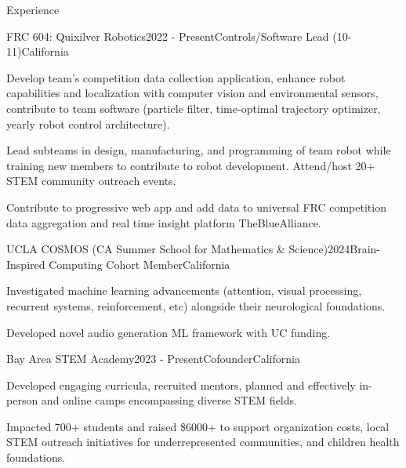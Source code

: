 \documentclass[
  10pt, %
]{resume} %
\begin{document}
\sloppy


\begin{rSection}{Experience}


  \begin{rSubsection}{FRC 604: Quixilver Robotics}{2022 - Present}{Controls/Software Lead (10-11)}{California}
    
    \item Develop team's competition data collection application, enhance robot capabilities and localization with computer vision and environmental sensors, contribute to team software (particle filter, time-optimal trajectory optimizer, yearly robot control architecture).
    
    \item Lead subteams in design, manufacturing, and programming of team robot while training new members to contribute to robot development. Attend/host 20+ STEM community outreach events.
    
    \item Contribute to progressive web app and add data to universal FRC competition data aggregation and real time insight platform TheBlueAlliance.
    
  \end{rSubsection}
        
  \begin{rSubsection}{UCLA COSMOS (CA Summer School for Mathematics \& Science)}{2024}{Brain-Inspired Computing Cohort Member}{California}
    
    \item Investigated machine learning advancements (attention, visual processing, recurrent systems, reinforcement, etc) alongside their neurological foundations.
    
    \item Developed novel audio generation ML framework with UC funding.
    
  \end{rSubsection}
        
  \begin{rSubsection}{Bay Area STEM Academy}{2023 - Present}{Cofounder}{California}
    
    \item Developed engaging curricula, recruited mentors, planned and effectively in-person and online camps encompassing diverse STEM fields.
    
    \item Impacted 700+ students and raised \$6000+ to support organization costs, local STEM outreach initiatives for underrepresented communities, and children health foundations.
    
  \end{rSubsection}
        
	
\end{rSection}
\end{document}
